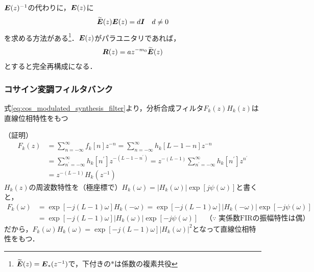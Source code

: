 \documentclass[14pt,xcolor=dvipsnames,table,dvipdfmx]{beamer}
\begin{document}
\begin{frame}[c]
    \frametitle{}
    $\boldsymbol{E}(z)^{-1}$の代わりに，$\boldsymbol{E}(z)$に
    \begin{align}
        \widetilde{\boldsymbol{E}}(z) \boldsymbol{E}(z) = d \boldsymbol{I} \quad d \neq 0
    \end{align}
    を求める方法がある\footnote{$\widetilde{\boldsymbol{E}}(z) = \boldsymbol{E}_{\ast}(z^{-1})$で，下付きの$\ast$は係数の複素共役}．$\boldsymbol{E}(z)$がパラユニタリであれば，
    \begin{align*}
        \boldsymbol{R}(z) = a z^{-m_{0}} \widetilde{\boldsymbol{E}}(z)
    \end{align*}
    とすると完全再構成になる．
\end{frame}

\begin{frame}[c]
    \frametitle{コサイン変調フィルタバンク}
    \begin{block}{}
        式\eqref{eq:cos_modulated_synthesis_filter}より，分析合成フィルタ$F_{k}(z)H_{k}(z)$は直線位相特性をもつ
    \end{block}
    \scriptsize
    （証明）
    \begin{align*}
        F_{k}(z) &= \sum_{n = -\infty}^{\infty} f_{k}[n] z^{-n} = \sum_{n = -\infty}^{\infty} h_{k}[L - 1 - n] z^{-n} \\
        &= \sum_{n^{\prime} = -\infty}^{\infty} h_{k}[n^{\prime}] z^{-(L - 1 - n^{\prime})} = z^{-(L-1)} \sum_{n^{\prime} = -\infty}^{\infty} h_{k}[n^{\prime}] z^{n^{\prime}} \\
        &= z^{-(L-1)} H_{k}(z^{-1})
    \end{align*}
    $H_{k}(z)$の周波数特性を（極座標で）$H_{k}(\omega) = |H_{k}(\omega)| \exp[j \psi(\omega)]$と書くと，
    \begin{align*}
        F_{k}(\omega) &= \exp[-j(L - 1)\omega] H_{k}(-\omega) = \exp[-j(L - 1)\omega] |H_{k}(-\omega)| \exp[-j \psi(\omega)] \\
        &= \exp[-j(L - 1)\omega] |H_{k}(\omega)| \exp[-j \psi(\omega)] \quad \text{（$\because$ 実係数FIRの振幅特性は偶）}
    \end{align*}
    だから，$F_{k}(\omega) H_{k}(\omega) = \exp[-j(L - 1)\omega] |H_{k}(\omega)|^{2}$となって直線位相特性をもつ．
\end{frame}
\end{document}

